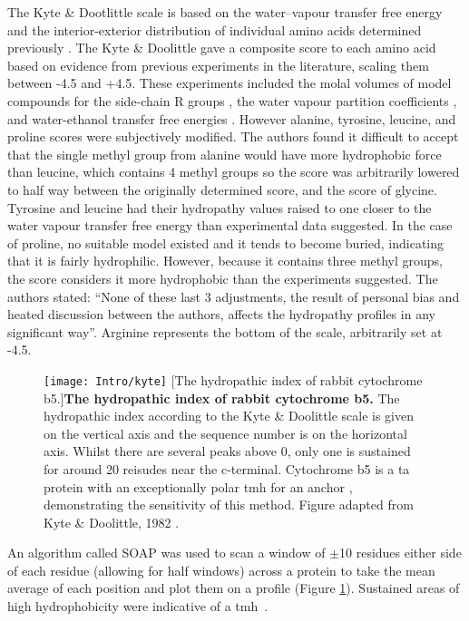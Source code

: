 The Kyte \& Dootlittle scale \cite{Kyte1982} is based on the water\---vapour transfer free energy and the interior-exterior distribution of individual amino acids determined previously \cite{Chothia1976}.
The Kyte \& Doolittle gave a composite score to each amino acid based on evidence from previous experiments in the literature, scaling them between -4.5 and +4.5.
These experiments included the molal volumes of model compounds for the side\--chain R groups \cite{Wolfenden1979, Cohn1934, Traube1899}, the water vapour partition coefficients \cite{Hine1975, Wolfenden1979}, and water\--ethanol transfer free energies \cite{Cohn1943, Nozaki1971}.
However alanine, tyrosine, leucine, and proline scores were subjectively modified.
The authors found it difficult to accept that the single methyl group from alanine would have more hydrophobic force than leucine, which contains 4 methyl groups so the score was arbitrarily lowered to half way between the originally determined score, and the score of glycine.
Tyrosine and leucine had their hydropathy values raised to one closer to the water vapour transfer free energy than experimental data suggested.
In the case of proline, no suitable model existed and it tends to become buried, indicating that it is fairly hydrophilic.
However, because it contains three methyl groups, the score considers it more hydrophobic than the experiments suggested.
The authors stated: ``None of these last 3 adjustments, the result of personal bias and heated discussion between the authors, affects the hydropathy profiles in any significant way''\cite{Kyte1982}.
Arginine represents the bottom of the scale, arbitrarily set at -4.5.

\begin{figure}[ht]
\centering
\texttt{[image: Intro/kyte]}
		[The hydropathic index of rabbit cytochrome b5.]{\textbf{The hydropathic index of rabbit cytochrome b5.}
		The hydropathic index according to the Kyte \& Doolittle scale \cite{Kyte1982} is given on the vertical axis and the sequence number is on the horizontal axis.
		Whilst there are several peaks above 0, only one is sustained for around 20 reisudes near the c\--terminal.
		Cytochrome b5 is a \gls{ta} protein with an exceptionally polar \gls{tmh} for an anchor \cite{Brambillasca2006}, demonstrating the sensitivity of this method.
		Figure adapted from Kyte \& Doolittle, 1982 \cite{Kyte1982}.
		}
\label{fig:kyte}
\end{figure}

An algorithm called SOAP was used to scan a window of $\pm$10 residues either side of each residue (allowing for half windows) across a protein to take the mean average of each position and plot them on a profile (Figure \ref{fig:kyte}).
Sustained areas of high hydrophobicity were indicative of a \gls{tmh}~\cite{Kyte1982}.

